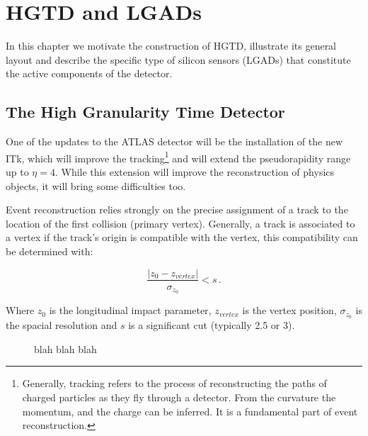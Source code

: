 \chapter{HGTD and LGADs}\label{chap:HGTD_LGADs}

In this chapter we motivate the construction of HGTD, illustrate its general layout and describe the specific type of silicon sensors (LGADs) that constitute the active components of the detector.

\section{The High Granularity Time Detector}\label{sec:HGTD}
One of the updates to the ATLAS detector will be the installation of the new ITk, which will improve the tracking\footnote{Generally, tracking refers to the process of reconstructing the paths of charged particles as they fly through a detector. From the curvature the momentum, and the charge can be inferred. It is a fundamental part of event reconstruction.} and will extend the pseudorapidity range up to $\eta=4$. While this extension will improve the reconstruction of physics objects, it will bring some difficulties too. 

Event reconstruction relies strongly on the precise assignment of a track to the location of the first collision (primary vertex).%
Generally, a track is associated to a vertex if the track's origin is compatible with the vertex, this compatibility can be determined with:

\begin{equation}
    \frac{\left|z_0 - z_{vertex}\right|}{\sigma_{z_0}} < s \,.
\end{equation}
 
Where $z_0$ is the longitudinal impact parameter, $z_{vertex}$ is the vertex position, $\sigma_{z_0}$ is the spacial resolution and $s$ is a significant cut (typically 2.5 or 3)\cite{cernTechnicalDesign}. 

\begin{figure}[!ht]
    \centering
    \hfill
    \centering
    \caption{blah blah blah}
\end{figure}

